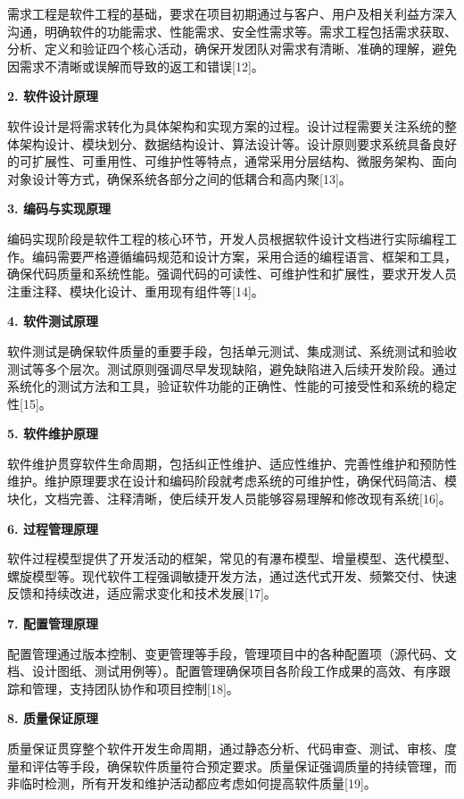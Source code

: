 \documentclass[12pt,a4paper]{article}
\begin{document}
需求工程是软件工程的基础，要求在项目初期通过与客户、用户及相关利益方深入沟通，明确软件的功能需求、性能需求、安全性需求等。需求工程包括需求获取、分析、定义和验证四个核心活动，确保开发团队对需求有清晰、准确的理解，避免因需求不清晰或误解而导致的返工和错误{[}12{]}。

\textbf{2. 软件设计原理}

软件设计是将需求转化为具体架构和实现方案的过程。设计过程需要关注系统的整体架构设计、模块划分、数据结构设计、算法设计等。设计原则要求系统具备良好的可扩展性、可重用性、可维护性等特点，通常采用分层结构、微服务架构、面向对象设计等方式，确保系统各部分之间的低耦合和高内聚{[}13{]}。

\textbf{3. 编码与实现原理}

编码实现阶段是软件工程的核心环节，开发人员根据软件设计文档进行实际编程工作。编码需要严格遵循编码规范和设计方案，采用合适的编程语言、框架和工具，确保代码质量和系统性能。强调代码的可读性、可维护性和扩展性，要求开发人员注重注释、模块化设计、重用现有组件等{[}14{]}。

\textbf{4. 软件测试原理}

软件测试是确保软件质量的重要手段，包括单元测试、集成测试、系统测试和验收测试等多个层次。测试原则强调尽早发现缺陷，避免缺陷进入后续开发阶段。通过系统化的测试方法和工具，验证软件功能的正确性、性能的可接受性和系统的稳定性{[}15{]}。

\textbf{5. 软件维护原理}

软件维护贯穿软件生命周期，包括纠正性维护、适应性维护、完善性维护和预防性维护。维护原理要求在设计和编码阶段就考虑系统的可维护性，确保代码简洁、模块化，文档完善、注释清晰，使后续开发人员能够容易理解和修改现有系统{[}16{]}。

\textbf{6. 过程管理原理}

软件过程模型提供了开发活动的框架，常见的有瀑布模型、增量模型、迭代模型、螺旋模型等。现代软件工程强调敏捷开发方法，通过迭代式开发、频繁交付、快速反馈和持续改进，适应需求变化和技术发展{[}17{]}。

\textbf{7. 配置管理原理}

配置管理通过版本控制、变更管理等手段，管理项目中的各种配置项（源代码、文档、设计图纸、测试用例等）。配置管理确保项目各阶段工作成果的高效、有序跟踪和管理，支持团队协作和项目控制{[}18{]}。

\textbf{8. 质量保证原理}

质量保证贯穿整个软件开发生命周期，通过静态分析、代码审查、测试、审核、度量和评估等手段，确保软件质量符合预定要求。质量保证强调质量的持续管理，而非临时检测，所有开发和维护活动都应考虑如何提高软件质量{[}19{]}。
\end{document}
